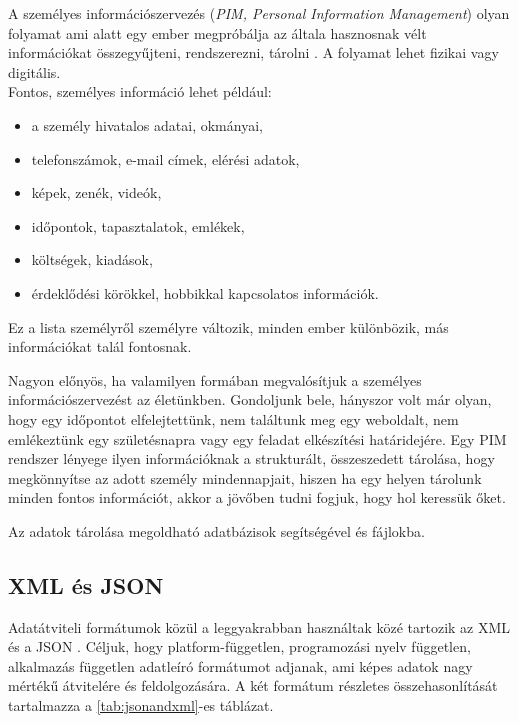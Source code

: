 

A személyes információszervezés (\textit{PIM, Personal Information Management}) olyan folyamat ami alatt egy ember megpróbálja az általa hasznosnak vélt információkat összegyűjteni, rendszerezni, tárolni \cite{enwiki:1076787930}. A folyamat lehet fizikai vagy digitális.
\vspace{5pt}\\ Fontos, személyes információ lehet például:
\begin{itemize}
	\item a személy hivatalos adatai, okmányai,
	\item telefonszámok, e-mail címek, elérési adatok,
	\item képek, zenék, videók,
	\item időpontok, tapasztalatok, emlékek,
	\item költségek, kiadások,
	\item érdeklődési körökkel, hobbikkal kapcsolatos információk.
\end{itemize}
Ez a lista személyről személyre változik, minden ember különbözik, más információkat talál fontosnak.

Nagyon előnyös, ha valamilyen formában megvalósítjuk a személyes információszervezést az életünkben.
Gondoljunk bele, hányszor volt már olyan, hogy egy időpontot elfelejtettünk, nem találtunk meg egy weboldalt, nem emlékeztünk egy születésnapra vagy egy feladat elkészítési határidejére. Egy PIM rendszer lényege ilyen információknak a strukturált, összeszedett tárolása, hogy megkönnyítse az adott személy mindennapjait, hiszen ha egy helyen tárolunk minden fontos információt, akkor a jövőben tudni fogjuk, hogy hol keressük őket.

\newpage {}

Az adatok tárolása megoldható adatbázisok segítségével és fájlokba.

\subsection{XML és JSON}

Adatátviteli formátumok közül a leggyakrabban használtak közé tartozik az XML és a JSON \cite{nurseitov2009comparison}. Céljuk, hogy platform-független, programozási nyelv független, alkalmazás független adatleíró formátumot adjanak, ami képes adatok nagy mértékű átvitelére és feldolgozására. A két formátum részletes összehasonlítását tartalmazza a \ref{tab:jsonandxml}-es táblázat.

